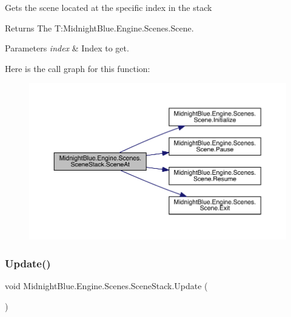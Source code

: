 Gets the scene located at the specific index in the stack 

\begin{DoxyReturn}{Returns}
The T\+:\+Midnight\+Blue.\+Engine.\+Scenes.\+Scene.
\end{DoxyReturn}

\begin{DoxyParams}{Parameters}
{\em index} & Index to get.\\
\hline
\end{DoxyParams}
Here is the call graph for this function\+:
\nopagebreak
\begin{figure}[H]
\begin{center}
\leavevmode
\includegraphics[width=350pt]{class_midnight_blue_1_1_engine_1_1_scenes_1_1_scene_stack_a7c391b4275e6e8c72478c3e73560f4df_cgraph}
\end{center}
\end{figure}
\hypertarget{class_midnight_blue_1_1_engine_1_1_scenes_1_1_scene_stack_a440c1403c5992a98a7f9fb9feb8849cc}{}\label{class_midnight_blue_1_1_engine_1_1_scenes_1_1_scene_stack_a440c1403c5992a98a7f9fb9feb8849cc} 
\subsubsection{\texorpdfstring{Update()}{Update()}}
{\footnotesize\ttfamily void Midnight\+Blue.\+Engine.\+Scenes.\+Scene\+Stack.\+Update (\begin{DoxyParamCaption}{ }\end{DoxyParamCaption})\hspace{0.3cm}{\ttfamily [inline]}}



